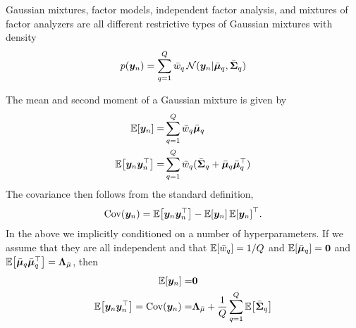 \documentclass{article}
\newcommand{\obs}{y}
\newcommand{\obsvec}{\bm{\obs}}
\newcommand{\mean}{\mu}
\newcommand{\meanvec}{\bm{\mean}}
\newcommand{\weight}{w}
\newcommand{\compweight}{\bar{\weight}}
\newcommand{\compmean}{\bar{\mean}}
\newcommand{\compmeanvec}{\bar{\meanvec}}
\newcommand{\compcov}{\bar{\bm{\Sigma}}}
\newcommand{\noisecov}{\bm{\Lambda}}
\begin{document}
Gaussian mixtures, factor models, independent factor analysis, and mixtures of factor analyzers are all different restrictive types of Gaussian mixtures with density
\begin{equation}
p(\obsvec_n)=\sum_{q=1}^{Q}\compweight_{q}\gaussrnd(\obsvec_n|\compmeanvec_q,\compcov_q)
\end{equation} 

The mean and second moment of a Gaussian mixture is given by
\begin{align}
\E{\obsvec_n}=&\sum_{q=1}^{Q}\compweight_q\compmeanvec_q\\
\E{\obsvec_n\obsvec_n\T}=&\sum_{q=1}^{Q}\compweight_q(\compcov_q + \compmeanvec_q\compmeanvec_q\T)
\end{align}
The covariance then follows from the standard definition,
\begin{equation}
\Cov{\obsvec_n}=\E{\obsvec_n\obsvec_n\T}-\E{\obsvec_n}\E{\obsvec_n}\T.
\end{equation}
In the above we implicitly conditioned on a number of hyperparameters. If we assume that they are all independent and that $\E{\compweight_q}=1/Q$ and $\E{\compmeanvec_q}=\bm{0}$ and $\E{\compmeanvec_q\compmeanvec_q\T}=\noisecov_{\compmean}$, then
\begin{align}
\E{\obsvec_n}=&\bm{0}\\
\label{eq:margcov}
\E{\obsvec_n\obsvec_n\T}=\Cov{\obsvec_n}=&\noisecov_{\compmean}+\frac{1}{Q}\sum_{q=1}^{Q}\E{\compcov_q}
\end{align} 
\end{document}
